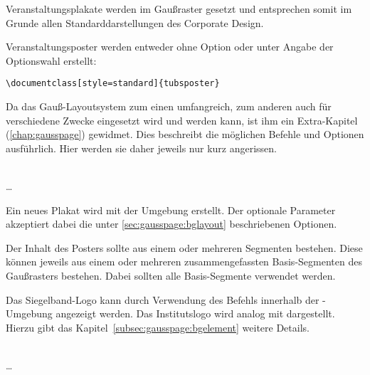 Veranstaltungsplakate werden im Gaußraster gesetzt und entsprechen somit
im Grunde allen Standarddarstellungen des Corporate Design.

Veranstaltungsposter werden entweder ohne Option oder
unter Angabe der Optionswahl  erstellt:
\begin{lstlisting}
\documentclass[style=standard]{tubsposter}
\end{lstlisting}

Da das Gauß-Layoutsystem zum einen umfangreich, zum anderen auch für verschiedene Zwecke eingesetzt wird und werden kann, ist ihm ein Extra-Kapitel (\ref{chap:gausspage})
gewidmet.
Dies beschreibt die möglichen Befehle und Optionen ausführlich.
Hier werden sie daher jeweils nur kurz angerissen.


\begin{Declaration}
    \\
  \quad\dots\\
\end{Declaration}

Ein neues Plakat wird mit der Umgebung  erstellt.
Der optionale Parameter  akzeptiert dabei die
unter \ref{sec:gausspage:bglayout} beschriebenen Optionen.

Der Inhalt des Posters sollte aus einem oder mehreren Segmenten bestehen.
Diese können jeweils aus einem oder mehreren zusammengefassten Basis-Segmenten
des Gaußrasters bestehen. Dabei sollten alle Basis-Segmente verwendet werden.

\begin{sloppypar}
Das Siegelband-Logo kann durch Verwendung des Befehls 
innerhalb der -Umgebung angezeigt werden.
Das Institutslogo wird analog mit 
dargestellt. Hierzu gibt das Kapitel~\ref{subsec:gausspage:bgelement}
weitere Details.
\end{sloppypar}

\begin{Declaration}
    \\
  \quad\dots\\
\end{Declaration}

